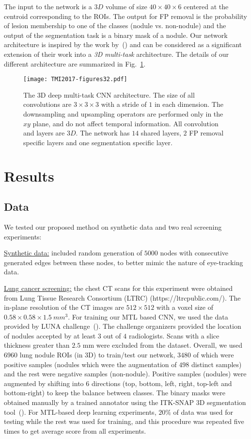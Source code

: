 \documentclass[preprint,12pt]{elsarticle}
\begin{document}
The input to the network is a $3D$ volume of size $40\times 40\times 6$ centered at the centroid corresponding to the ROIs. The output for FP removal is the probability of lesion membership to one of the classes (nodule vs. non-nodule) and the output of the segmentation task is a binary mask of a nodule. Our network architecture is inspired by the work by~(\cite{badrinarayanan2017segnet}) and can be considered as a significant extension of their work into a \textit{3D} \textit{multi-task} architecture. The details of our different architecture are summarized in Fig.~\ref{fig:architecture}.

\begin{figure}[h]
\centering
\texttt{[image: TMI2017-figures32.pdf]}
\caption{The 3D deep multi-task CNN architecture. The size of all convolutions are $3\times 3\times 3$ with a stride of $1$ in each dimension. The downsampling and upsampling operators are performed only in the $xy$ plane, and do not affect temporal information. All convolution and layers are $3D$. The network has $14$ shared layers, $2$ FP removal specific layers and one segmentation specific layer. \label{fig:architecture}}
\end{figure}

\section{Results}
\subsection{Data}
We tested our proposed method on synthetic data and two real screening experiments:

\underline{Synthetic data:} included random generation of $5000$ nodes with consecutive generated edges between these nodes, to better mimic the nature of eye-tracking data.

\underline{Lung cancer screening:} the chest CT scans for this experiment were obtained from  Lung Tissue Research Consortium (LTRC) (https://ltrcpublic.com/). The in-plane resolution of the CT images are $512\times 512$ with a voxel size of $0.58\times 0.58\times 1.5~mm^{3}$. For training our MTL based CNN, we used the data provided by LUNA challenge~(\cite{LUNA16}). The challenge organizers provided the location of nodules accepted by at least $3$ out of $4$ radiologists. Scans with a slice thickness greater than $2.5$ mm were excluded from the dataset. Overall, we used $6960$ lung nodule ROIs (in 3D) to train/test our network, $3480$ of which were positive samples (nodules which were the augmentation of $498$ distinct samples) and the rest were negative samples (non-nodule). Positive samples (nodules) were augmented by shifting into $6$ directions (top, bottom, left, right, top-left and bottom-right) to keep the balance between classes. The binary masks were obtained manually by a trained annotator using the ITK-SNAP 3D segmentation tool~(\cite{yushkevich2016itk}). For MTL-based deep learning experiments, $20\%$ of data was used for testing while the rest was used for training, and this procedure was repeated five times to get average score from all experiments.
\end{document}
